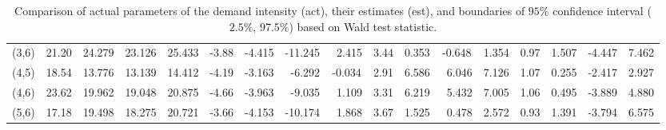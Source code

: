 \begin{sidewaystable}[p]
\begin{tabular}{c|cccc|cccc|cccc|cccc}
  (3,6) & 21.20 & 24.279 & 23.126 & 25.433 & -3.88 & -4.415 & -11.245 & ~2.415 & 3.44 & 0.353 & -0.648 & 1.354 & 0.97 & 1.507 & -4.447 & 7.462 \\ 
  (4,5) & 18.54 & 13.776 & 13.139 & 14.412 & -4.19 & -3.163 & ~-6.292 & -0.034 & 2.91 & 6.586 & ~6.046 & 7.126 & 1.07 & 0.255 & -2.417 & 2.927 \\ 
  (4,6) & 23.62 & 19.962 & 19.048 & 20.875 & -4.66 & -3.963 & ~-9.035 & ~1.109 & 3.31 & 6.219 & ~5.432 & 7.005 & 1.06 & 0.495 & -3.889 & 4.880 \\ 
  (5,6) & 17.18 & 19.498 & 18.275 & 20.721 & -3.66 & -4.153 & -10.174 & ~1.868 & 3.67 & 1.525 & ~0.478 & 2.572 & 0.93 & 1.391 & -3.794 & 6.575 \\ 
   \bottomrule
\end{tabular}
\caption{Comparison of actual parameters of the demand intensity (act), their estimates (est), and boundaries of $95\%$ confidence interval ($2.5\%$, $97.5\%$) based on Wald test statistic.}
\label{tab:estimatedBeta}
\end{sidewaystable}
